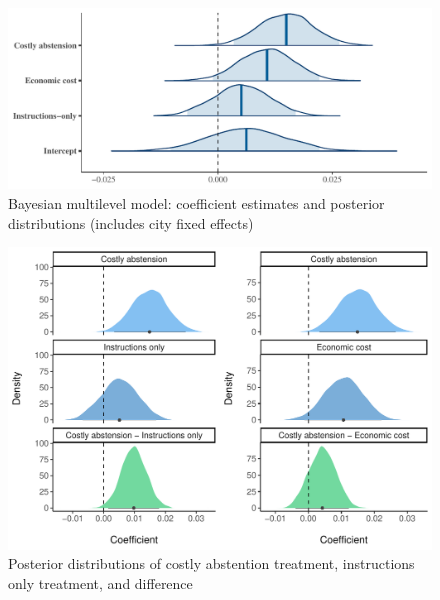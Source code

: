 \documentclass[12pt,final,fleqn]{article}
\theoremstyle{plain}
\begin{document}
\begin{figure}[!htb]
\includegraphics[width = \textwidth]{../figs/fgA10.pdf}
\caption{Bayesian multilevel model: coefficient estimates and posterior distributions (includes city fixed effects)}
\label{fig: bayes_coef}
\end{figure}

\begin{figure}[!htb]
\includegraphics[width = \textwidth]{../figs/fgA11.pdf}
\caption{Posterior distributions of costly abstention treatment, instructions only treatment, and difference}
\label{fig: posterior_dists}
\end{figure}
\end{document}
